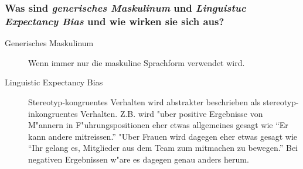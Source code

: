 \subsubsection{Was sind \emph{generisches Maskulinum} und \emph{Linguistuc Expectancy Bias} und wie wirken sie sich aus?}
\begin{description}
        \item[Generisches Maskulinum] Wenn immer nur die maskuline Sprachform verwendet wird.
        \item[Linguistic Expectancy Bias] Stereotyp-kongruentes Verhalten wird abstrakter beschrieben als stereotyp-inkongruentes Verhalten. Z.B. wird "uber positive Ergebnisse von M"annern in F"uhrungspositionen eher etwas allgemeines gesagt wie ``Er kann andere mitreissen.'' "Uber Frauen wird dagegen eher etwas gesagt wie ``Ihr gelang es, Mitglieder aus dem Team zum mitmachen zu bewegen.'' Bei negativen Ergebnissen w"are es dagegen genau anders herum.
\end{description}
